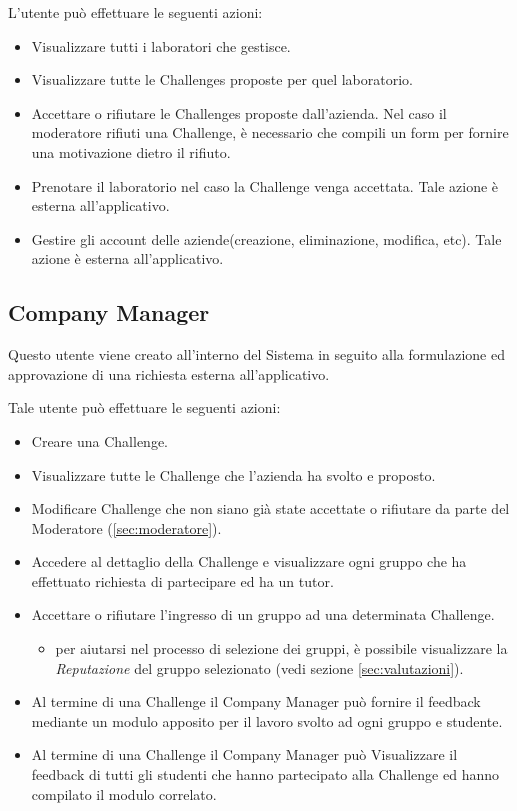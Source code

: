 L'utente può effettuare le seguenti azioni:
\begin{itemize}
    \item Visualizzare tutti i laboratori che gestisce. 
    \item Visualizzare tutte le Challenges proposte per quel laboratorio.
    \item Accettare o rifiutare le Challenges proposte dall'azienda. Nel caso il moderatore rifiuti una Challenge, è necessario che compili un form per fornire una motivazione dietro il rifiuto.
    \item Prenotare il laboratorio nel caso la Challenge venga accettata. Tale azione è esterna all'applicativo.
    \item Gestire gli account delle aziende(creazione, eliminazione, modifica, etc). Tale azione è esterna all'applicativo.
\end{itemize}


\subsection{Company Manager}

Questo utente viene creato all'interno del Sistema in seguito alla formulazione ed approvazione di una richiesta esterna all'applicativo.

Tale utente può effettuare le seguenti azioni:
\begin{itemize}
    \item Creare una Challenge.
    \item Visualizzare tutte le Challenge che l'azienda ha svolto e proposto.
    \item Modificare Challenge che non siano già state accettate o rifiutare da parte del Moderatore (\ref{sec:moderatore}).
    \item Accedere al dettaglio della Challenge e visualizzare ogni gruppo che ha effettuato richiesta di partecipare ed ha un tutor.
    \item Accettare o rifiutare l'ingresso di un gruppo ad una determinata Challenge. 
        \begin{itemize}
            \item per aiutarsi nel processo di selezione dei gruppi, è possibile visualizzare la \textit{Reputazione} del gruppo selezionato (vedi sezione \ref{sec:valutazioni}).
        \end{itemize}
    \item Al termine di una Challenge il Company Manager può fornire il feedback mediante un modulo apposito per il lavoro svolto ad ogni gruppo e studente. 
    \item Al termine di una Challenge il Company Manager può Visualizzare il feedback di tutti gli studenti che hanno partecipato alla Challenge ed hanno compilato il modulo correlato.
\end{itemize}

